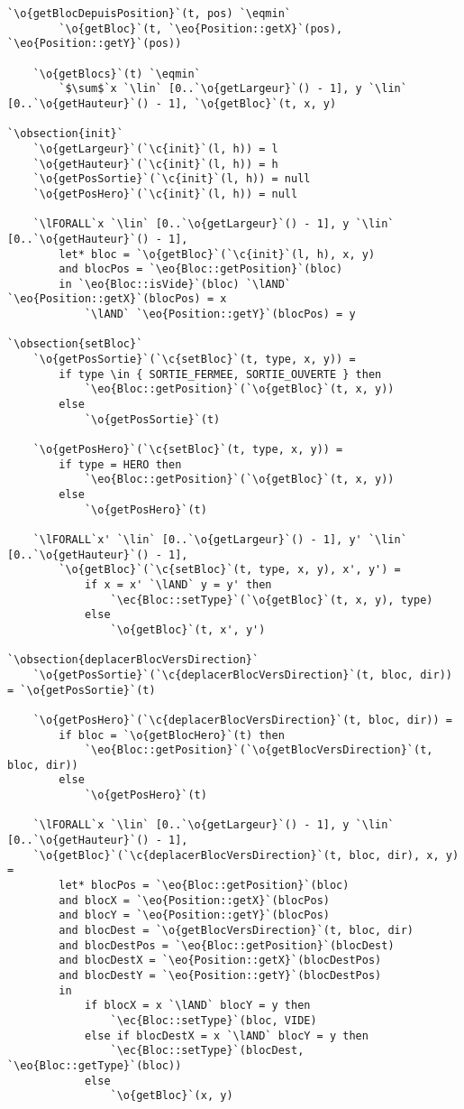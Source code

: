 \documentclass{article}
\newcommand{\eqmin}{$\overset{min}{=}$}
\newcommand{\lAND}{$\land$}
\newcommand{\lFORALL}{$\forall$}
\newcommand{\lin}{$\in$}
\newcommand{\obsection}[1]{\textbf{[#1]}}
\renewcommand{\o}[1]{\textcolor{blue}{#1}}
\renewcommand{\c}[1]{\textcolor{red}{#1}}
\newcommand{\eo}[1]{\textcolor{RoyalPurple}{#1}}
\newcommand{\ec}[1]{\textcolor{BrickRed}{#1}}
\begin{document}
\begin{lstlisting}[caption=Terrain]
	`\o{getBlocDepuisPosition}`(t, pos) `\eqmin`
		`\o{getBloc}`(t, `\eo{Position::getX}`(pos), `\eo{Position::getY}`(pos))

	`\o{getBlocs}`(t) `\eqmin`
		`$\sum$`x `\lin` [0..`\o{getLargeur}`() - 1], y `\lin` [0..`\o{getHauteur}`() - 1], `\o{getBloc}`(t, x, y)

`\obsection{init}`
	`\o{getLargeur}`(`\c{init}`(l, h)) = l
	`\o{getHauteur}`(`\c{init}`(l, h)) = h
	`\o{getPosSortie}`(`\c{init}`(l, h)) = null
	`\o{getPosHero}`(`\c{init}`(l, h)) = null

	`\lFORALL`x `\lin` [0..`\o{getLargeur}`() - 1], y `\lin` [0..`\o{getHauteur}`() - 1],
		let* bloc = `\o{getBloc}`(`\c{init}`(l, h), x, y)
		and blocPos = `\eo{Bloc::getPosition}`(bloc)
		in `\eo{Bloc::isVide}`(bloc) `\lAND` `\eo{Position::getX}`(blocPos) = x
			`\lAND` `\eo{Position::getY}`(blocPos) = y

`\obsection{setBloc}`
	`\o{getPosSortie}`(`\c{setBloc}`(t, type, x, y)) =
		if type \in { SORTIE_FERMEE, SORTIE_OUVERTE } then
			`\eo{Bloc::getPosition}`(`\o{getBloc}`(t, x, y))
		else
			`\o{getPosSortie}`(t)

	`\o{getPosHero}`(`\c{setBloc}`(t, type, x, y)) =
		if type = HERO then
			`\eo{Bloc::getPosition}`(`\o{getBloc}`(t, x, y))
		else
			`\o{getPosHero}`(t)

	`\lFORALL`x' `\lin` [0..`\o{getLargeur}`() - 1], y' `\lin` [0..`\o{getHauteur}`() - 1],
		`\o{getBloc}`(`\c{setBloc}`(t, type, x, y), x', y') =
			if x = x' `\lAND` y = y' then
				`\ec{Bloc::setType}`(`\o{getBloc}`(t, x, y), type)
			else
				`\o{getBloc}`(t, x', y')

`\obsection{deplacerBlocVersDirection}`
	`\o{getPosSortie}`(`\c{deplacerBlocVersDirection}`(t, bloc, dir)) = `\o{getPosSortie}`(t)

	`\o{getPosHero}`(`\c{deplacerBlocVersDirection}`(t, bloc, dir)) =
		if bloc = `\o{getBlocHero}`(t) then
			`\eo{Bloc::getPosition}`(`\o{getBlocVersDirection}`(t, bloc, dir))
		else
			`\o{getPosHero}`(t)

	`\lFORALL`x `\lin` [0..`\o{getLargeur}`() - 1], y `\lin` [0..`\o{getHauteur}`() - 1],
	`\o{getBloc}`(`\c{deplacerBlocVersDirection}`(t, bloc, dir), x, y) =
		let* blocPos = `\eo{Bloc::getPosition}`(bloc)
		and blocX = `\eo{Position::getX}`(blocPos)
		and blocY = `\eo{Position::getY}`(blocPos)
		and blocDest = `\o{getBlocVersDirection}`(t, bloc, dir)
		and blocDestPos = `\eo{Bloc::getPosition}`(blocDest)
		and blocDestX = `\eo{Position::getX}`(blocDestPos)
		and blocDestY = `\eo{Position::getY}`(blocDestPos)
		in
			if blocX = x `\lAND` blocY = y then
				`\ec{Bloc::setType}`(bloc, VIDE)
			else if blocDestX = x `\lAND` blocY = y then
				`\ec{Bloc::setType}`(blocDest, `\eo{Bloc::getType}`(bloc))
			else
				`\o{getBloc}`(x, y)


\end{lstlisting}
\end{document}
